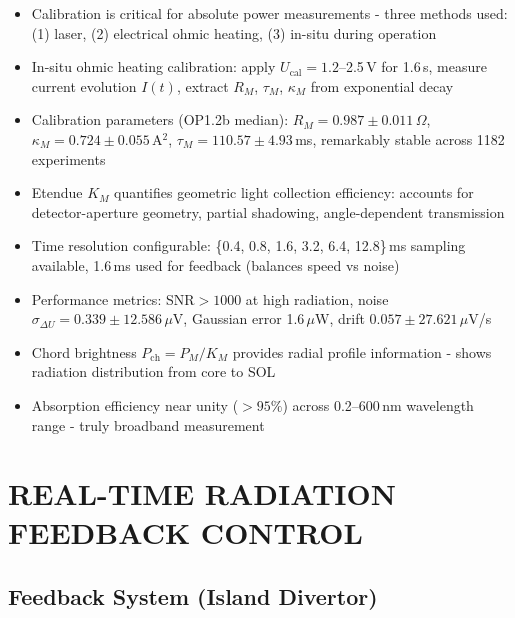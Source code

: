 \documentclass[11pt,a4paper]{article}
\begin{document}
\begin{itemize}
\item Calibration is critical for absolute power measurements - three methods used: (1) laser, (2) electrical ohmic heating, (3) in-situ during operation
\item In-situ ohmic heating calibration: apply $U_{\text{cal}}=1.2$--2.5\,V for 1.6\,s, measure current evolution $I(t)$, extract $R_M$, $\tau_M$, $\kappa_M$ from exponential decay
\item Calibration parameters (OP1.2b median): $R_M=0.987\pm0.011$\,$\Omega$, $\kappa_M=0.724\pm0.055$\,A$^2$, $\tau_M=110.57\pm4.93$\,ms, remarkably stable across 1182 experiments
\item Etendue $K_M$ quantifies geometric light collection efficiency: accounts for detector-aperture geometry, partial shadowing, angle-dependent transmission
\item Time resolution configurable: \{0.4, 0.8, 1.6, 3.2, 6.4, 12.8\}\,ms sampling available, 1.6\,ms used for feedback (balances speed vs noise)
\item Performance metrics: SNR$>1000$ at high radiation, noise $\sigma_{\Delta U}=0.339\pm12.586$\,$\mu$V, Gaussian error 1.6\,$\mu$W, drift $0.057\pm27.621$\,$\mu$V/s
\item Chord brightness $P_{\text{ch}} = P_M/K_M$ provides radial profile information - shows radiation distribution from core to SOL
\item Absorption efficiency near unity ($>95\%$) across 0.2--600\,nm wavelength range - truly broadband measurement
\end{itemize}

\section{REAL-TIME RADIATION FEEDBACK CONTROL}

\subsection{Feedback System (Island Divertor)}
\end{document}
